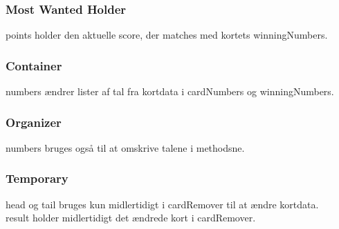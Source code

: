 \documentclass[a4paper,12pt]{article}
\begin{document}
\subsubsection*{Most Wanted Holder}
points holder den aktuelle score, der matches med kortets winningNumbers.

\subsubsection*{Container}
numbers ændrer lister af tal fra kortdata i cardNumbers og winningNumbers.

\subsubsection*{Organizer}
numbers bruges også til at omskrive talene i methodsne.

\subsubsection*{Temporary}
head og tail bruges kun midlertidigt i cardRemover til at ændre kortdata.\\
result holder midlertidigt det ændrede kort i cardRemover.
\end{document}
